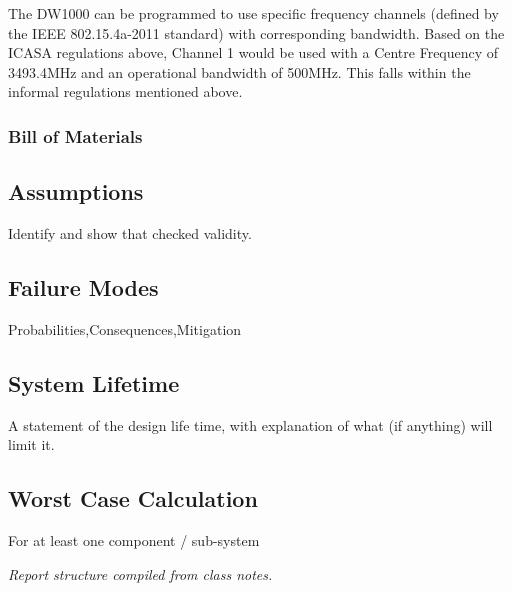 The DW1000 can be programmed to use specific frequency channels (defined by the IEEE 802.15.4a-2011 standard) with corresponding bandwidth. Based on the ICASA regulations above, Channel 1 would be used with a Centre Frequency of 3493.4MHz and an operational bandwidth of 500MHz. This falls within the informal regulations mentioned above. 

\subsubsection{Bill of Materials}

\subsection{Assumptions}
Identify and show that checked validity.
\subsection{Failure Modes}
Probabilities,Consequences,Mitigation
\subsection{System Lifetime}
A statement of the design life time, with explanation of what (if anything) will limit it.
\subsection{Worst Case Calculation}
For at least one component / sub-system 

\textit{Report structure compiled from class notes.}\cite{handout}\cite{notes}



\newpage





\newpage
